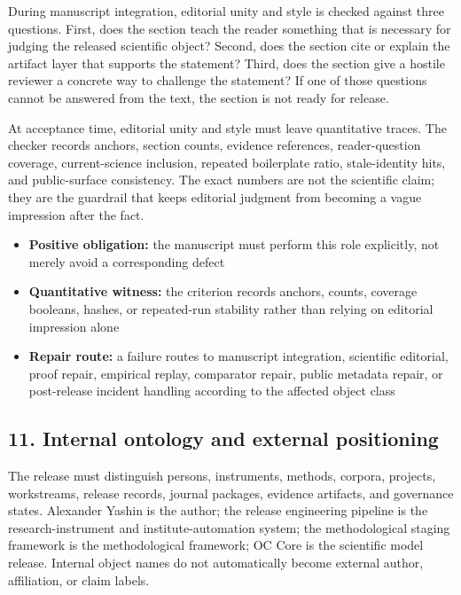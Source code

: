 During manuscript integration, editorial unity and style is checked against three questions. First, does the section teach the reader something that is necessary for judging the released scientific object? Second, does the section cite or explain the artifact layer that supports the statement? Third, does the section give a hostile reviewer a concrete way to challenge the statement? If one of those questions cannot be answered from the text, the section is not ready for release.


At acceptance time, editorial unity and style must leave quantitative traces. The checker records anchors, section counts, evidence references, reader-question coverage, current-science inclusion, repeated boilerplate ratio, stale-identity hits, and public-surface consistency. The exact numbers are not the scientific claim; they are the guardrail that keeps editorial judgment from becoming a vague impression after the fact.


\begin{itemize}[leftmargin=1.8em]

\item \textbf{Positive obligation:} the manuscript must perform this role explicitly, not merely avoid a corresponding defect

\item \textbf{Quantitative witness:} the criterion records anchors, counts, coverage booleans, hashes, or repeated-run stability rather than relying on editorial impression alone

\item \textbf{Repair route:} a failure routes to manuscript integration, scientific editorial, proof repair, empirical replay, comparator repair, public metadata repair, or post-release incident handling according to the affected object class

\end{itemize}

\subsection{11. Internal ontology and external positioning}

The release must distinguish persons, instruments, methods, corpora, projects, workstreams, release records, journal packages, evidence artifacts, and governance states. Alexander Yashin is the author; the release engineering pipeline is the research-instrument and institute-automation system; the methodological staging framework is the methodological framework; OC Core is the scientific model release. Internal object names do not automatically become external author, affiliation, or claim labels.


